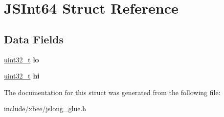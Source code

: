 \hypertarget{struct_j_s_int64}{}\section{J\+S\+Int64 Struct Reference}
\label{struct_j_s_int64}
\subsection*{Data Fields}
\begin{DoxyCompactItemize}
\item 
\mbox{\label{struct_j_s_int64_af696b3c873ee8212d81d86659e59bcc6}} 
\hyperlink{group__hal__dos_ga09a1e304d66d35dd47daffee9731edaa}{uint32\+\_\+t} {\bfseries lo}
\item 
\mbox{\label{struct_j_s_int64_aa824c8f5bb758efbe41747a4005e7456}} 
\hyperlink{group__hal__dos_ga09a1e304d66d35dd47daffee9731edaa}{uint32\+\_\+t} {\bfseries hi}
\end{DoxyCompactItemize}


The documentation for this struct was generated from the following file\+:\begin{DoxyCompactItemize}
\item 
include/xbee/jslong\+\_\+glue.\+h\end{DoxyCompactItemize}
